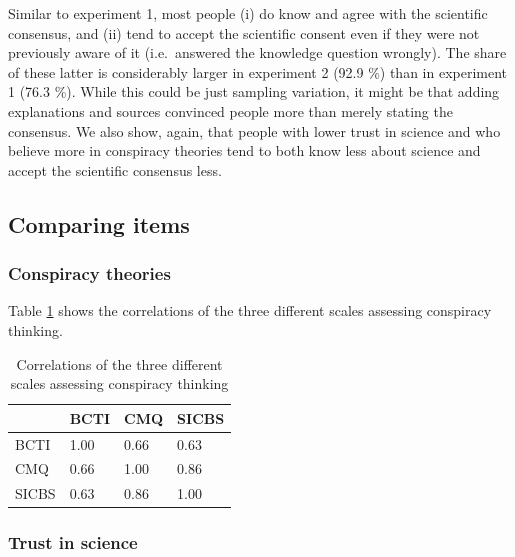 \documentclass[
  doc,floatsintext]{apa6}
\begin{document}
Similar to experiment 1, most people (i) do know and agree with the scientific consensus, and (ii) tend to accept the scientific consent even if they were not previously aware of it (i.e.~answered the knowledge question wrongly). The share of these latter is considerably larger in experiment 2 (92.9 \%) than in experiment 1 (76.3 \%). While this could be just sampling variation, it might be that adding explanations and sources convinced people more than merely stating the consensus. We also show, again, that people with lower trust in science and who believe more in conspiracy theories tend to both know less about science and accept the scientific consensus less.

\subsection{Comparing items}\label{comparing-items-1}

\subsubsection{Conspiracy theories}\label{conspiracy-theories-1}

Table \ref{tab:exp2-correlation-conspiracy} shows the correlations of the three different scales assessing conspiracy thinking.

\begin{table}[h]

\begin{center}
\begin{threeparttable}

\caption{\label{tab:exp2-correlation-conspiracy}Correlations of the three different scales assessing conspiracy thinking}

\begin{tabular}{llll}
\toprule
 & \multicolumn{1}{c}{BCTI} & \multicolumn{1}{c}{CMQ} & \multicolumn{1}{c}{SICBS}\\
\midrule
BCTI & 1.00 & 0.66 & 0.63\\
CMQ & 0.66 & 1.00 & 0.86\\
SICBS & 0.63 & 0.86 & 1.00\\
\bottomrule
\end{tabular}

\end{threeparttable}
\end{center}

\end{table}

\subsubsection{Trust in science}\label{trust-in-science-4}
\end{document}
